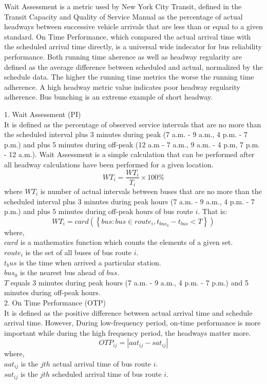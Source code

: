 \documentclass[12pt,journal,compsoc]{IEEEtran}
\begin{document}
Wait Assessment is a metric used by New York City Transit, defined in the Transit Capacity and Quality of Service Manual as the percentage of actual headways between successive vehicle arrivals that are less than or equal to a given standard. On Time Performance, which compared the actual arrival time with the scheduled arrival time directly, is a universal wide indecator for bus reliability performance. Both running time aherence as well as headway regularity are defined as the average difference between scheduled and actual, normalized by the schedule data. The higher the running time metrics the worse the running time adherence. A high headway metric value indicates poor headway regularity adherence. Bus bunching is an extreme example of short headway.
 
1. Wait Assessment (PI)\\
It is defined as the percentage of observed service intervals that are no more than the scheduled interval plus 3 minutes during peak (7 a.m. - 9 a.m., 4 p.m. - 7 p.m.) and plus 5 minutes during off-peak (12 a.m - 7 a.m., 9 a.m. - 4 p.m, 7 p.m. - 12 a.m.). Wait Assessment is a simple calculation that can be performed after all headway calculations have been performed for a given location.
$$WT_i = \frac{WT_i}{T_i} \times 100\%$$
where $WT_i$ is number of actual intervals between buses that are no more than the scheduled interval plus 3 minutes during peak hours (7 a.m. - 9 a.m., 4 p.m. - 7 p.m.) and plus 5 minutes during off-peak hours of bus route $i$. That is:\\
$$WT_i = card \left( \left\lbrace  bus:bus \in route_i ,  t_{bus_0} - t_{bus} < T \right\rbrace \right)$$
where,\\
$card$ is a mathematics function which counts the elements of a given set. \\
$route_i$ is the set of all buses of bus route $i$.   \\
$t_bus$ is the time when  arrived a particular station.  \\
$bus_0$ is the nearest bus ahead of $bus$.\\
$T$ equals 3 minutes during peak hours (7 a.m. - 9 a.m., 4 p.m. - 7 p.m.) and 5 minutes during off-peak hours.\\

2. On Time Performance (OTP)\\
It is defined as the positive difference between actual arrival time and schedule arrival time. However, During low-frequency period, on-time performance is more important while during the high frequency period, the headways matter more.
$$OTP_{ij} = |aat_{ij} - sat_{ij}|$$
where,\\
$aat_{ij}$ is the $jth$ actual arrival time of bus route $i$.\\
$sat_{ij}$ is the $jth$ scheduled arrival time of bus route $i$.\\
\end{document}
